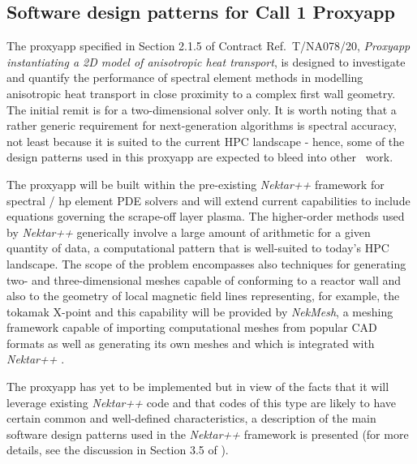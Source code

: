 \subsection{Software design patterns for Call 1 Proxyapp}\label{sec:call1}


The proxyapp specified in Section 2.1.5 of Contract Ref.\ T/NA078/20, {\it Proxyapp instantiating a 2D model of anisotropic heat transport}, is designed to investigate and quantify the performance of spectral element methods \cite{karniadakissherwin} in modelling anisotropic heat transport in close proximity to a complex first wall geometry.
The initial remit is for a two-dimensional solver only.
It is worth noting that a rather generic requirement for next-generation algorithms is spectral accuracy, not least because it is suited to the current HPC landscape - hence, some of the design patterns used in this proxyapp are expected to bleed into other \nep\ work.


The proxyapp will be built within the pre-existing {\it Nektar++} framework for spectral / hp element PDE solvers \cite{nektarwebsite} and will extend current capabilities to include equations governing the scrape-off layer plasma.  
The higher-order methods used by {\it Nektar++} generically involve a large amount of arithmetic for a given quantity of data, a computational pattern that is well-suited to today's HPC landscape.  
The scope of the problem encompasses also techniques for generating two- and three-dimensional meshes capable of conforming to a reactor wall and also to the geometry of local magnetic field lines representing, for example, the tokamak X-point and this capability will be provided by {\it NekMesh}, a meshing framework capable of importing computational meshes from popular CAD formats as well as generating its own meshes and which is integrated with {\it Nektar++} \cite{nektarwebsite}.


The proxyapp has yet to be implemented but in view of the facts that it will leverage existing {\it Nektar++} code and that codes of this type are likely to have certain common and well-defined characteristics, a description of the main software design patterns used in the {\it Nektar++} framework is presented (for more details, see the discussion in Section 3.5 of \cite{nektardevelopersguide}).

